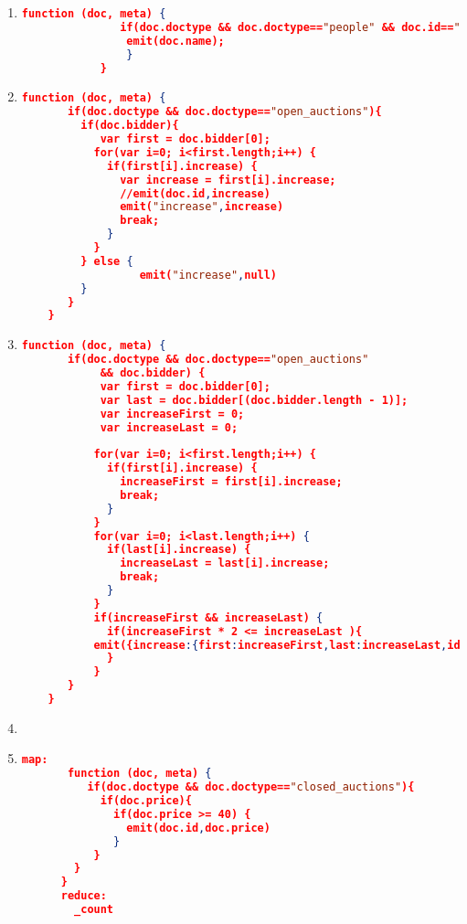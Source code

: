 \begin{enumerate}[label=Q\arabic*]
	\item \label{cb-q-1}%
	\begin{lstlisting}[language=JSON, basicstyle=\scriptsize]
			function (doc, meta) {
			   if(doc.doctype && doc.doctype=="people" && doc.id=="person0"){
				emit(doc.name);	   
			    }
			}
		\end{lstlisting}

	\item \label{cb-q-2}%
	\begin{lstlisting}[language=JSON, basicstyle=\scriptsize]
	function (doc, meta) {
	   if(doc.doctype && doc.doctype=="open_auctions"){
	     if(doc.bidder){
	     	var first = doc.bidder[0];
	       for(var i=0; i<first.length;i++) {
	         if(first[i].increase) {
	           var increase = first[i].increase;
	           //emit(doc.id,increase)
	           emit("increase",increase)
	           break;
	         }
	       }
	     } else {
	     	      emit("increase",null)
	     }
	   }
	}
	\end{lstlisting}
	
    \item \label{cb-q-3}%
	\begin{lstlisting}[language=JSON, basicstyle=\scriptsize]
	  function (doc, meta) {
       if(doc.doctype && doc.doctype=="open_auctions" 
            && doc.bidder) {
         	var first = doc.bidder[0];
           	var last = doc.bidder[(doc.bidder.length - 1)];
            var increaseFirst = 0;
            var increaseLast = 0;
           
           for(var i=0; i<first.length;i++) {
             if(first[i].increase) {
               increaseFirst = first[i].increase;
               break;
             }
           }
           for(var i=0; i<last.length;i++) {
             if(last[i].increase) {
               increaseLast = last[i].increase;
               break;
             }
           }
           if(increaseFirst && increaseLast) {
             if(increaseFirst * 2 <= increaseLast ){
    	   emit({increase:{first:increaseFirst,last:increaseLast,id:doc.id}});
             }
           } 
       }
    }
	\end{lstlisting}
	
	
    \item \label{cb-q-4}%
	\par
	
	
    \item \label{cb-q-5}%
	\begin{lstlisting}[language=JSON, basicstyle=\scriptsize]
	map:
	   function (doc, meta) {
	      if(doc.doctype && doc.doctype=="closed_auctions"){
	        if(doc.price){
	          if(doc.price >= 40) {
	            emit(doc.id,doc.price)
	          }
	       }
	    }
	  }
	  reduce: 
	    _count
	\end{lstlisting}
	

\end{enumerate}
